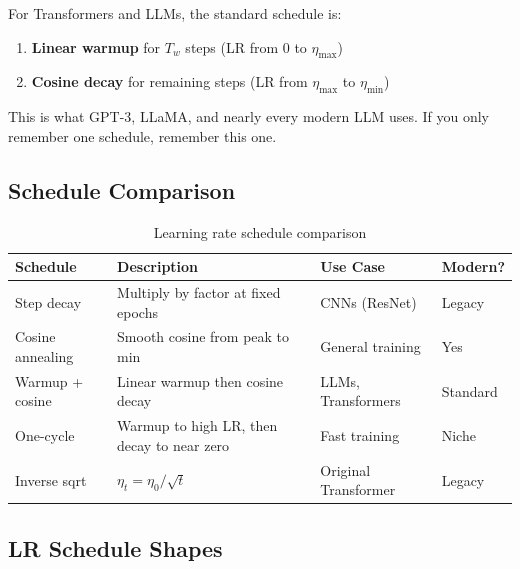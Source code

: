 For Transformers and LLMs, the standard schedule is:
\begin{enumerate}
    \item \textbf{Linear warmup} for $T_w$ steps (LR from 0 to $\eta_{\max}$)
    \item \textbf{Cosine decay} for remaining steps (LR from $\eta_{\max}$ to $\eta_{\min}$)
\end{enumerate}

This is what GPT-3, LLaMA, and nearly every modern LLM uses. If you only remember one schedule, remember this one.

\subsection{Schedule Comparison}

\begin{table}[H]
\centering
\caption{Learning rate schedule comparison}
\begin{tabularx}{\textwidth}{lXXl}
\toprule
\textbf{Schedule} & \textbf{Description} & \textbf{Use Case} & \textbf{Modern?} \\
\midrule
Step decay & Multiply by factor at fixed epochs & CNNs (ResNet) & Legacy \\
Cosine annealing & Smooth cosine from peak to min & General training & Yes \\
Warmup + cosine & Linear warmup then cosine decay & LLMs, Transformers & Standard \\
One-cycle & Warmup to high LR, then decay to near zero & Fast training & Niche \\
Inverse sqrt & $\eta_t = \eta_0 / \sqrt{t}$ & Original Transformer & Legacy \\
\bottomrule
\end{tabularx}
\end{table}

\subsection{LR Schedule Shapes}

